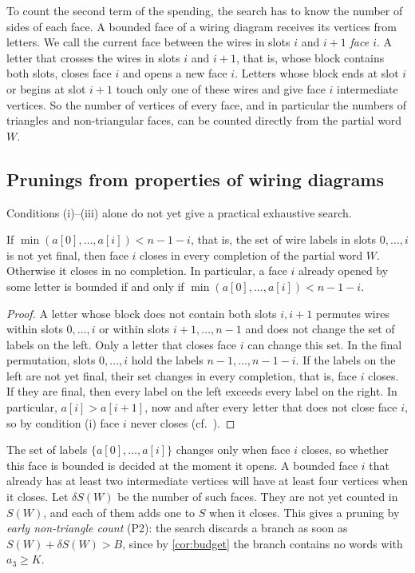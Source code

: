 To count the second term of the spending, the search has to know the number of sides of each face.
A bounded face of a wiring diagram receives its vertices from letters.
We call the current face between the wires in slots $i$ and $i+1$ \emph{face $i$}.
A letter that crosses the wires in slots $i$ and $i+1$, that is, whose block contains both slots, closes face $i$ and opens a new face $i$.
Letters whose block ends at slot $i$ or begins at slot $i+1$ touch only one of these wires and give face $i$ intermediate vertices.
So the number of vertices of every face, and in particular the numbers of triangles and non-triangular faces, can be counted directly from the partial word $W$.

\subsection{Prunings from properties of wiring diagrams}

Conditions (i)--(iii) alone do not yet give a practical exhaustive search.

\begin{lemma}\label{lem:bounded-face}
If $\min(a[0],\ldots,a[i])<n-1-i$, that is, the set of wire labels in slots $0,\ldots,i$ is not yet final, then face $i$ closes in every completion of the partial word $W$. Otherwise it closes in no completion.
In particular, a face $i$ already opened by some letter is bounded if and only if $\min(a[0],\ldots,a[i])<n-1-i$.
\end{lemma}

\begin{proof}
A letter whose block does not contain both slots $i,i+1$ permutes wires within slots $0,\ldots,i$ or within slots $i+1,\ldots,n-1$ and does not change the set of labels on the left. Only a letter that closes face $i$ can change this set.
In the final permutation, slots $0,\ldots,i$ hold the labels $n-1,\ldots,n-1-i$.
If the labels on the left are not yet final, their set changes in every completion, that is, face $i$ closes.
If they are final, then every label on the left exceeds every label on the right.
In particular, $a[i]>a[i+1]$, now and after every letter that does not close face $i$, so by condition (i) face $i$ never closes (cf.~\cite[Remark~B.8]{pu26b}).
\end{proof}

The set of labels $\{a[0],\ldots,a[i]\}$ changes only when face $i$ closes, so whether this face is bounded is decided at the moment it opens.
A bounded face $i$ that already has at least two intermediate vertices will have at least four vertices when it closes.
Let $\delta S(W)$ be the number of such faces.
They are not yet counted in $S(W)$, and each of them adds one to $S$ when it closes.
This gives a pruning by \emph{early non-triangle count} (P2): the search discards a branch as soon as $S(W)+\delta S(W)>B$, since by \cref{cor:budget} the branch contains no words with $a_3\ge K$.

